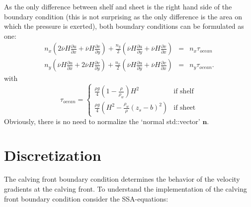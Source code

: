 \documentclass[a4paper,10pt]{article}
\begin{document}
As the only difference between shelf and sheet is the right hand side of the boundary condition (this is not surprising as the only difference is the area on which the pressure is exerted), both boundary conditions can be formulated as one:
\begin{eqnarray}%
n_x\left(2\overline{\nu}H\frac{\partial u}{\partial x}+\overline{\nu}H\frac{\partial v}{\partial y}  \right) + \frac{n_y}{2} \left(\overline{\nu}H\frac{\partial u}{\partial y} + \overline{\nu}H\frac{\partial v}{\partial x} \right) & =  & n_x\tau_{ocean} \label{BC1}\\  
 n_y\left(\overline{\nu}H\frac{\partial u}{\partial x}+2\overline{\nu}H\frac{\partial v}{\partial y}  \right) + \frac{n_x}{2} \left(\overline{\nu}H\frac{\partial u}{\partial y} + \overline{\nu}H\frac{\partial v}{\partial x} \right) & = & n_y\tau_{ocean}. \label{BC2}
\end{eqnarray}
with 
\begin{equation}
\tau_{ocean} = \left\{
\begin{array}{ll}
\frac{\rho g}{4}\left(1-\frac{\rho}{\rho_w}\right)H^2 & \text{if shelf} \\
\frac{\rho g}{4}\left(H^2-\frac{\rho_w}{\rho} ( z_s-b)^2 \right) & \text{if sheet}
\end{array} \right.
\end{equation}
Obviously, there is no need to normalize the `normal std::vector' $\mathbf{n}$.
\section{Discretization}

\noindent The calving front boundary condition determines the behavior of the velocity gradients at the calving front. To understand the implementation of the calving front boundary condition consider the SSA-equations:
\end{document}
